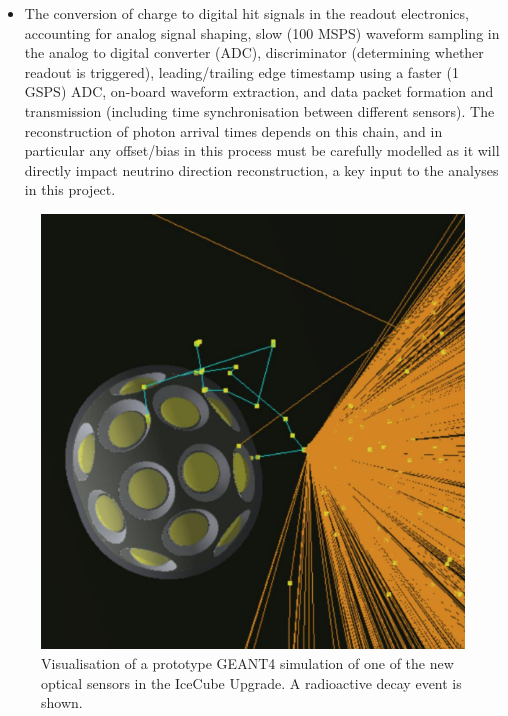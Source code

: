 \documentclass[a4paper,11pt]{article}
\begin{document}
\begin{itemize}[leftmargin=*]
    \item The conversion of charge to digital hit signals in the readout electronics, accounting for analog signal shaping, slow (100 MSPS) waveform sampling in the analog to digital converter (ADC), discriminator (determining whether readout is triggered), leading/trailing edge timestamp using a faster (1 GSPS) ADC, on-board waveform extraction, and data packet formation and transmission (including time synchronisation between different sensors). The reconstruction of photon arrival times depends on this chain, and in particular any offset/bias in this process must be carefully modelled as it will directly impact neutrino direction reconstruction, a key input to the analyses in this project.
\end{itemize}

\begin{figure} %
    \centering
    \includegraphics[trim=0.0cm 0.0cm 0.cm 1.0cm, clip=true, width=\linewidth]{images/mDOM_noise.png}
    \caption{Visualisation of a prototype GEANT4 simulation of one of the new optical sensors in the IceCube Upgrade. A radioactive decay event is shown.}
    \label{fig:mDOM_sim}
\end{figure}
\end{document}
